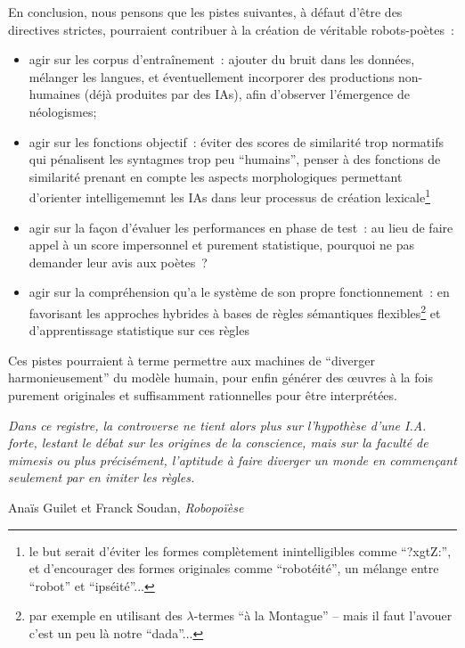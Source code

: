\documentclass{article}
\newenvironment{citationbox}
{\begin{center}
		\begin{minipage}{.8\textwidth}
		}
		{
		\end{minipage}	
\end{center}
}
\begin{document}
				En conclusion, nous pensons que les pistes suivantes, à défaut d'être des directives strictes, pourraient contribuer à la création de véritable robots-poètes~:
				\vspace{2mm}
				\begin{itemize}
					\item agir sur les corpus d'entraînement~: ajouter du bruit dans les données, mélanger les langues, et éventuellement incorporer des productions non-humaines (déjà produites par des IAs), afin d'observer l'émergence de néologismes;
					\item agir sur les fonctions objectif~: éviter des scores de similarité trop normatifs qui pénalisent les syntagmes trop peu ``humains'', penser à des fonctions de similarité prenant en compte les aspects morphologiques permettant d'orienter intelligememnt les IAs dans leur processus de création lexicale\footnote{le but serait d'éviter les formes complètement inintelligibles comme ``?xgtZ:'', et d'encourager des formes originales comme ``robotéité'', un mélange entre ``robot'' et ``ipséité''...}
					\item agir sur la façon d'évaluer les performances en phase de test~: au lieu de faire appel à un score impersonnel et purement statistique, pourquoi ne pas demander leur avis aux poètes~? 
					\item agir sur la compréhension qu'a le système de son propre fonctionnement~: en favorisant les approches hybrides à bases de règles sémantiques flexibles\footnote{par exemple en utilisant des $\lambda$-termes ``à la Montague'' -- mais il faut l'avouer c'est un peu là notre ``dada''...} et d'apprentissage statistique sur ces règles
				\end{itemize}
				\vspace{2mm}
				Ces pistes pourraient à terme permettre aux machines de ``diverger harmonieusement'' du modèle humain, pour enfin générer des œuvres à la fois purement originales et suffisamment rationnelles pour être interprétées.
				\begin{citationbox}
					\textit{Dans ce registre, la controverse ne tient alors plus sur l'hypothèse d'une I.A. forte, lestant le débat sur les origines de la conscience, mais sur la faculté de mimesis ou plus précisément, l'aptitude à faire diverger un monde en commençant seulement par en imiter les règles.}
					\begin{flushright}
						Anaïs Guilet et Franck Soudan, \textit{Robopoïèse} \cite{guilet2017}
					\end{flushright}
				\end{citationbox}
	
\end{document}
